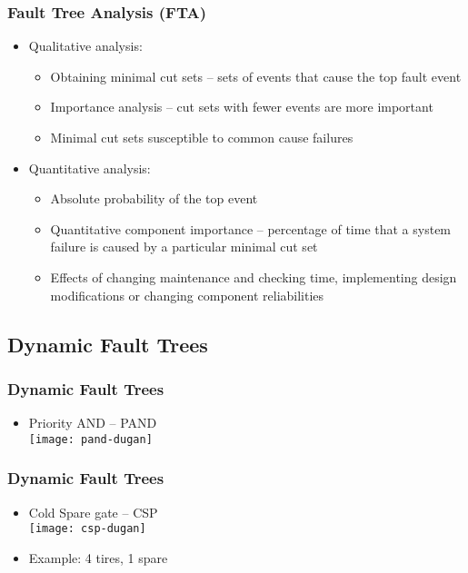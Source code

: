 \begin{frame}
\frametitle{Fault Tree Analysis (FTA)}


\begin{itemize}
  \item Qualitative analysis:
    \begin{itemize}
      \item Obtaining minimal cut sets -- sets of events that cause the top fault event
      \item Importance analysis -- cut sets with fewer events are more important
      \item Minimal cut sets susceptible to common cause failures
    \end{itemize}
  \item Quantitative analysis:
    \begin{itemize}
      \item Absolute probability of the top event
      \item Quantitative component importance -- percentage of time that a system failure is caused by a particular minimal cut set
      \item Effects of changing maintenance and checking time, implementing design modifications or changing component reliabilities
    \end{itemize}
\end{itemize}
\end{frame}

\subsection{Dynamic Fault Trees}

\begin{frame}
\frametitle{Dynamic Fault Trees}
\begin{itemize}
  \item Priority AND -- PAND\\
    \texttt{[image: pand-dugan]}
\end{itemize}
\end{frame}

\begin{frame}
\frametitle{Dynamic Fault Trees}
\begin{itemize}
  \item Cold Spare gate -- CSP\\
    \texttt{[image: csp-dugan]}
  \item Example: 4 tires, 1 spare
\end{itemize}
\end{frame}

